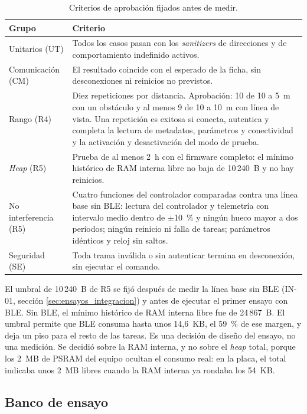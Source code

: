 \begin{table}[htbp]
\centering
\caption{Criterios de aprobación fijados antes de medir.}
\label{tab:criterios_ensayo}
\small
\begin{tabular}{L{0.22\textwidth} L{0.68\textwidth}}
\toprule
\textbf{Grupo} & \textbf{Criterio} \\
\midrule
Unitarios (UT) & Todos los casos pasan con los \textit{sanitizers} de direcciones y de comportamiento indefinido activos. \\
Comunicación (CM) & El resultado coincide con el esperado de la ficha, sin desconexiones ni reinicios no previstos. \\
Rango (R4) & Diez repeticiones por distancia. Aprobación: 10 de 10 a 5~m con un obstáculo y al menos 9 de 10 a 10~m con línea de vista. Una repetición es exitosa si conecta, autentica y completa la lectura de metadatos, parámetros y conectividad y la activación y desactivación del modo de prueba. \\
\textit{Heap} (R5) & Prueba de al menos 2~h con el firmware completo: el mínimo histórico de RAM interna libre no baja de 10\,240~B y no hay reinicios. \\
No interferencia (R5) & Cuatro funciones del controlador comparadas contra una línea base sin BLE: lectura del controlador y telemetría con intervalo medio dentro de $\pm$10~\% y ningún hueco mayor a dos períodos; ningún reinicio ni falla de tareas; parámetros idénticos y reloj sin saltos. \\
Seguridad (SE) & Toda trama inválida o sin autenticar termina en desconexión, sin ejecutar el comando. \\
\bottomrule
\end{tabular}
\end{table}

El umbral de 10\,240~B de R5 se fijó después de medir la línea base sin BLE (IN-01, sección \ref{sec:ensayos_integracion}) y antes de ejecutar el primer ensayo con BLE. Sin BLE, el mínimo histórico de RAM interna libre fue de 24\,867~B. El umbral permite que BLE consuma hasta unos 14,6~KB, el 59~\% de ese margen, y deja un piso para el resto de las tareas. Es una decisión de diseño del ensayo, no una medición. Se decidió sobre la RAM interna, y no sobre el \textit{heap} total, porque los 2~MB de PSRAM del equipo ocultan el consumo real: en la placa, el total indicaba unos 2~MB libres cuando la RAM interna ya rondaba los 54~KB.

\subsection{Banco de ensayo}
\label{subsec:banco_ensayo}

